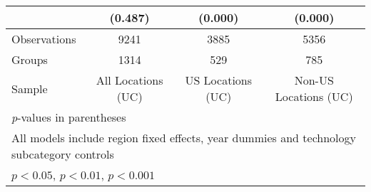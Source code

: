 {\begin{longtable}{l*{3}{c}}
                &  (0.487)         &  (0.000)         &  (0.000)         \\
\hline
Observations    &     9241         &     3885         &     5356         \\
Groups          &     1314         &      529         &      785         \\
Sample          &All Locations (UC)         &US Locations (UC)         &Non-US Locations (UC)         \\
\hline\hline
\multicolumn{4}{l}{\footnotesize \textit{p}-values in parentheses}\\
\multicolumn{4}{l}{\footnotesize All models include region fixed effects, year dummies and technology subcategory controls}\\
\multicolumn{4}{l}{\footnotesize \sym{*} \(p<0.05\), \sym{**} \(p<0.01\), \sym{***} \(p<0.001\)}\\
\end{longtable}
}
